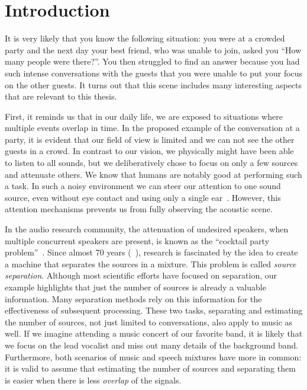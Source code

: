 \chapter{Introduction}\label{ch:introduction}


It is very likely that you know the following situation: you were at a crowded party and the next day your best friend, who was unable to join, asked you ``How many people were there?''.
You then struggled to find an answer because you had such intense conversations with the guests that you were unable to put your focus on the other guests.
It turns out that this scene includes many interesting aspects that are relevant to this thesis.
\par
First, it reminds us that in our daily life, we are exposed to situations where multiple events overlap in time.
In the proposed example of the conversation at a party, it is evident that our field of view is limited and we can not see the other guests in a crowd.
In contrast to our vision, we physically might have been able to listen to all sounds, but we deliberatively chose to focus on only a few sources and attenuate others.
We know that humans are notably good at performing such a task.
In such a noisy environment we can steer our attention to one sound source, even without eye contact and using only a single ear~\cite{bregman90}.
However, this attention mechanisms prevents us from fully observing the acoustic scene.
\par
In the audio research community, the attenuation of undesired speakers, when multiple concurrent speakers are present, is known as the ``cocktail party problem''~\cite{haykin05}.
Since almost 70 years (~\cite{cherry53}), research is fascinated by the idea to create a machine that separates the sources in a mixture.
This problem is called \emph{source separation}.
Although most scientific efforts have focused on separation, our example highlights that just the number of sources is already a valuable information.
Many separation methods rely on this information for the effectiveness of subsequent processing.
These two tasks, separating and estimating the number of sources, not just limited to conversations, also apply to music as well.
If we imagine attending a music concert of our favorite band, it is likely that we focus on the lead vocalist and miss out many details of the background band.
Furthermore, both scenarios of music and speech mixtures have more in common: it is valid to assume that estimating the number of sources and separating them is easier when there is less \emph{overlap} of the signals.
